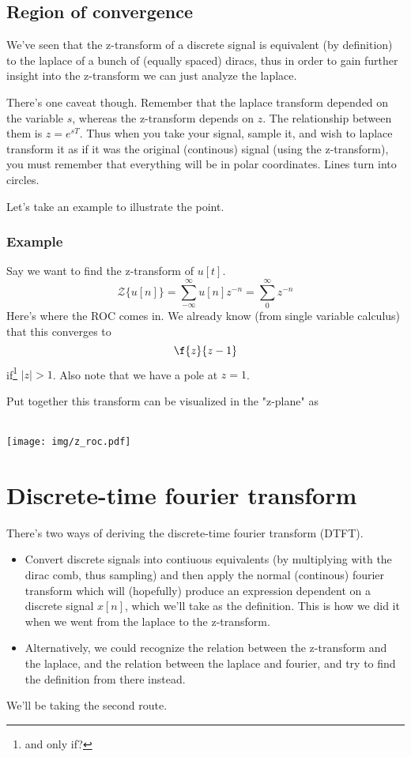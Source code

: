 \documentclass{article}
\newcommand{\0}{{\mathbf{0}}}
\begin{document}
\clearpage
\subsection{Region of convergence}
We've seen that the z-transform of a discrete signal is equivalent (by definition) to the laplace of a bunch of (equally spaced) diracs, thus
in order to gain further insight into the z-transform we can just analyze the laplace.

There's one caveat though. Remember that the laplace transform depended on the variable $s$, whereas the z-transform depends on $z$. The relationship between
them is $z=e^{sT}$. Thus when you take your signal, sample it, and wish to laplace transform it as if it was the original (continous) signal (using the z-transform), you must remember
that everything will be in polar coordinates. Lines turn into circles.

Let's take an example to illustrate the point.

\subsubsection{Example}
Say we want to find the z-transform of $u[t]$.
$$ \mathscr{Z}\{ u[n] \} = \sum^{\infty}_{-\infty} u[n]z^{-n} = \sum^{\infty}_{0} z^{-n} $$
Here's where the ROC comes in. We already know (from single variable calculus) that this
converges to
$$ \f{z}{z-1} $$
if\footnote{and only if?} $|z|>1$.
Also note that we have a pole at $z=1$.

Put together this transform can be visualized in the "z-plane" as
\\\\
\centerline{
  \texttt{[image: img/z\_roc.pdf]}
}





\clearpage

\section{Discrete-time fourier transform}
There's two ways of deriving the discrete-time fourier transform (DTFT).
\begin{itemize}
  \item Convert discrete signals into contiuous equivalents (by multiplying
    with the dirac comb, thus sampling) and then apply the normal (continous) fourier transform
    which will (hopefully) produce an expression dependent on a discrete signal $x[n]$, which
    we'll take as the definition.
    This is how we did it when we went from the laplace to the z-transform.
  \item Alternatively, we could recognize the relation between the z-transform
    and the laplace, and the relation between the laplace and fourier, and try to
    find the definition from there instead.
\end{itemize}
We'll be taking the second route.
\end{document}
